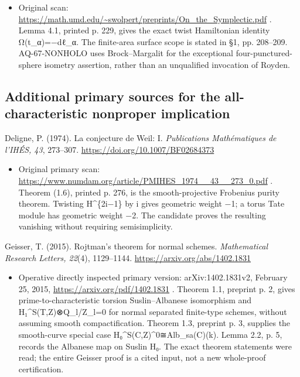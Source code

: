 \documentclass[11pt,a4paper]{article}
\providecommand{\tightlist}{\setlength{\itemsep}{0pt}\setlength{\parskip}{0pt}}
\theoremstyle{definition}\newtheorem{definition}[theorem]{Definition}
\theoremstyle{remark}\newtheorem{remark}[theorem]{Remark}
\begin{document}
\begin{itemize}
\tightlist
\item
  Original scan:
  \url{https://math.umd.edu/~swolpert/preprints/On_the_Symplectic.pdf} .
  Lemma 4.1, printed p. 229, gives the exact twist Hamiltonian identity
  Ω(t\_α)=−dℓ\_α. The finite-area surface scope is stated in §1, pp.
  208--209. AQ-67-NONHOLO uses Brock--Margalit for the exceptional
  four-punctured-sphere isometry assertion, rather than an unqualified
  invocation of Royden.
\end{itemize}

\subsection{Additional primary sources for the all-characteristic
nonproper
implication}\label{additional-primary-sources-for-the-all-characteristic-nonproper-implication}

Deligne, P. (1974). La conjecture de Weil: I. \emph{Publications
Mathématiques de l'IHÉS, 43}, 273--307.
\url{https://doi.org/10.1007/BF02684373}

\begin{itemize}
\tightlist
\item
  Original primary scan:
  \url{https://www.numdam.org/article/PMIHES_1974__43__273_0.pdf} .
  Theorem (1.6), printed p. 276, is the smooth-projective Frobenius
  purity theorem. Twisting H\^{}\{2i−1\} by i gives geometric weight −1;
  a torus Tate module has geometric weight −2. The candidate proves the
  resulting vanishing without requiring semisimplicity.
\end{itemize}

Geisser, T. (2015). Rojtman's theorem for normal schemes.
\emph{Mathematical Research Letters, 22}(4), 1129--1144.
\url{https://arxiv.org/abs/1402.1831}

\begin{itemize}
\tightlist
\item
  Operative directly inspected primary version: arXiv:1402.1831v2,
  February 25, 2015, \url{https://arxiv.org/pdf/1402.1831} . Theorem
  1.1, preprint p. 2, gives prime-to-characteristic torsion
  Suslin--Albanese isomorphism and H₁\^{}S(T,Z)⊗Q\_l/Z\_l=0 for normal
  separated finite-type schemes, without assuming smooth
  compactification. Theorem 1.3, preprint p. 3, supplies the
  smooth-curve special case H₀\^{}S(C,Z)\^{}0≅Alb\_sa(C)(k). Lemma 2.2,
  p. 5, records the Albanese map on Suslin H₀. The exact theorem
  statements were read; the entire Geisser proof is a cited input, not a
  new whole-proof certification.
\end{itemize}
\end{document}
